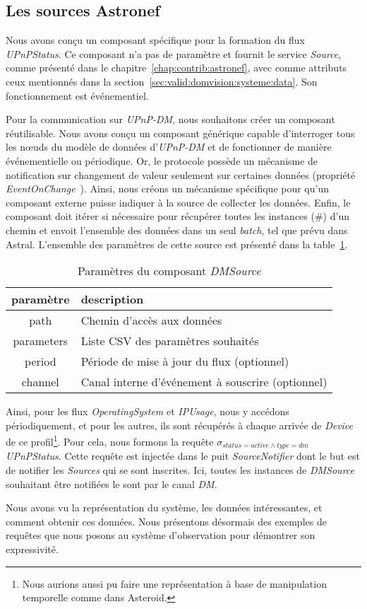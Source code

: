 \subsection{Les sources Astronef}
Nous avons conçu un composant spécifique pour la formation du flux \textit{UPnPStatus}. Ce composant n'a pas de paramètre et fournit le service \textit{Source}, comme présenté dans le chapitre~\ref{chap:contrib:astronef}, avec comme attributs ceux mentionnés dans la section~\ref{sec:valid:domvision:systeme:data}. Son fonctionnement est événementiel.

Pour la communication sur \textit{UPnP-DM}, nous souhaitons créer un composant réutilisable. Nous avons conçu un composant générique capable d'interroger tous les nœuds du modèle de données d'\textit{UPnP-DM} et de fonctionner de manière événementielle ou périodique. Or, le protocole possède un mécanisme de notification sur changement de valeur seulement sur certaines données (propriété \textit{EventOnChange}~\cite{UPnP:DM2}). Ainsi, nous créons un mécanisme spécifique pour qu'un composant externe puisse indiquer à la source de collecter les données. Enfin, le composant doit itérer si nécessaire pour récupérer toutes les instances (\#) d'un chemin et envoit l'ensemble des données dans un seul \textit{batch}, tel que prévu dans Astral. L'ensemble des paramètres de cette source est présenté dans la table~\ref{tab:valid:domvision:dmsource}.

\begin{table}[ht]
    \centering
    \begin{tabular}{cl}
        paramètre & description \\ \midrule
        path & Chemin d'accès aux données \\
        parameters & Liste CSV des paramètres souhaités \\
        period & Période de mise à jour du flux (optionnel) \\
        channel & Canal interne d'événement à souscrire (optionnel)
    \end{tabular}
    \caption{Paramètres du composant \textit{DMSource}}\label{tab:valid:domvision:dmsource}
\end{table}

Ainsi, pour les flux \textit{OperatingSystem} et \textit{IPUsage}, nous y accédons périodiquement, et pour les autres, ils sont récupérés à chaque arrivée de \textit{Device} de ce profil\footnote{Nous aurions aussi pu faire une représentation à base de manipulation temporelle comme dans Asteroid.}. Pour cela, nous formons la requête $\sigma_{status=active\wedge type=dm}$ \textit{UPnPStatus}. Cette requête est injectée dans le puit \textit{SourceNotifier} dont le but est de notifier les \textit{Sources} qui se sont inscrites. Ici, toutes les instances de \textit{DMSource} souhaitant être notifiées le sont par le canal \textit{DM}.

Nous avons vu la représentation du système, les données intéressantes, et comment obtenir ces données. Nous présentons désormais des exemples de requêtes que nous posons au système d'observation pour démontrer son expressivité.